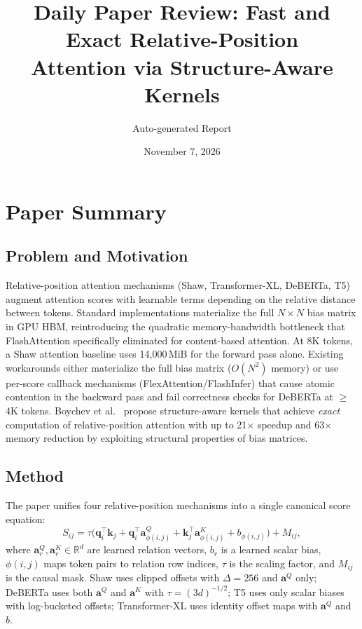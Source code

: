 \documentclass[11pt,a4paper]{article}
\title{Daily Paper Review: Fast and Exact Relative-Position\\Attention via Structure-Aware Kernels}
\author{Auto-generated Report}
\date{November 7, 2026}
\begin{document}
\maketitle

\section{Paper Summary}

\subsection{Problem and Motivation}
Relative-position attention mechanisms (Shaw, Transformer-XL, DeBERTa, T5) augment attention scores with learnable terms depending on the relative distance between tokens. Standard implementations materialize the full $N \times N$ bias matrix in GPU HBM, reintroducing the quadratic memory-bandwidth bottleneck that FlashAttention specifically eliminated for content-based attention. At 8K tokens, a Shaw attention baseline uses 14{,}000\,MiB for the forward pass alone. Existing workarounds either materialize the full bias matrix ($O(N^2)$ memory) or use per-score callback mechanisms (FlexAttention/FlashInfer) that cause atomic contention in the backward pass and fail correctness checks for DeBERTa at $\geq$4K tokens. Boychev et al.~\cite{boychev2026sak} propose structure-aware kernels that achieve \emph{exact} computation of relative-position attention with up to 21$\times$ speedup and 63$\times$ memory reduction by exploiting structural properties of bias matrices.

\subsection{Method}
The paper unifies four relative-position mechanisms into a single canonical score equation:
\begin{equation}
  S_{ij} = \tau\bigl(\mathbf{q}_i^\top \mathbf{k}_j + \mathbf{q}_i^\top \mathbf{a}^Q_{\phi(i,j)} + \mathbf{k}_j^\top \mathbf{a}^K_{\phi(i,j)} + b_{\phi(i,j)}\bigr) + M_{ij},
\end{equation}
where $\mathbf{a}^Q_r, \mathbf{a}^K_r \in \mathbb{R}^d$ are learned relation vectors, $b_r$ is a learned scalar bias, $\phi(i,j)$ maps token pairs to relation row indices, $\tau$ is the scaling factor, and $M_{ij}$ is the causal mask. Shaw uses clipped offsets with $\Delta{=}256$ and $\mathbf{a}^Q$ only; DeBERTa uses both $\mathbf{a}^Q$ and $\mathbf{a}^K$ with $\tau{=}(3d)^{-1/2}$; T5 uses only scalar biases with log-bucketed offsets; Transformer-XL uses identity offset maps with $\mathbf{a}^Q$ and $b$.
\end{document}
